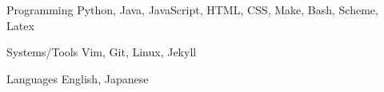 

\begin{cvskills}

  \cvskill
    {Programming} %
    {Python, Java, JavaScript, HTML, CSS, Make, Bash, Scheme, Latex} %

  \cvskill
    {Systems/Tools} %
    {Vim, Git, Linux, Jekyll} %

  \cvskill
    {Languages} %
    {English, Japanese} %

\end{cvskills}
